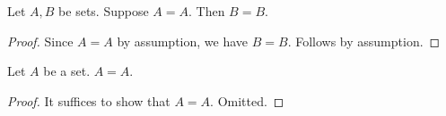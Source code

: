 \begin{proposition}\label{since_discharge_exact}
    Let $A,B$ be sets.
    Suppose $A=A$.
    Then $B=B$.
\end{proposition}
\begin{proof}
    Since $A=A$ by assumption, we have $B=B$.
    Follows by assumption.
\end{proof}

\begin{proposition}\label{suffices_omitted_exact}
    Let $A$ be a set.
    $A=A$.
\end{proposition}
\begin{proof}
    It suffices to show that $A=A$.
    Omitted.
\end{proof}

